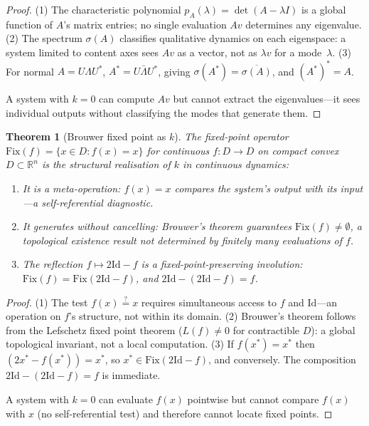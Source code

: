\documentclass[11pt,a4paper]{article}
\newtheorem{theorem}{Theorem}
\newcommand{\recu}[1]{{\color{kcolor}#1}}
\def\recu#1{#1}%
\begin{document}
\begin{proof}
(1) The characteristic polynomial $p_A(\lambda) = \det(A - \lambda I)$
is a global function of $A$'s matrix entries; no single evaluation $Av$
determines any eigenvalue. (2) The spectrum $\sigma(A)$ classifies
qualitative dynamics on each eigenspace: a system limited to content
axes sees $Av$ as a vector, not as $\lambda v$ for a mode~$\lambda$.
(3) For normal $A = U\Lambda U^*$, $A^* = U\bar\Lambda U^*$, giving
$\sigma(A^*) = \overline{\sigma(A)}$, and $(A^*)^* = A$.

A system with $k = 0$ can compute $Av$ but cannot extract the
eigenvalues---it sees individual outputs without classifying the modes
that generate them.
\end{proof}

\begin{theorem}[Brouwer fixed point as $\recu{k}$]
\label{thm:brouwer}
The fixed-point operator $\mathrm{Fix}(f) = \{x \in D : f(x) = x\}$
for continuous $f: D \to D$ on compact convex $D \subset \mathbb{R}^n$
is the structural realisation of $\recu{k}$ in continuous dynamics:
\begin{enumerate}[nosep]
  \item It is a meta-operation: $f(x) = x$ compares the system's output
    with its input---a self-referential diagnostic.
  \item It generates without cancelling: Brouwer's theorem guarantees
    $\mathrm{Fix}(f) \neq \emptyset$, a topological existence result
    not determined by finitely many evaluations of $f$.
  \item The reflection $f \mapsto 2\mathrm{Id} - f$ is a
    fixed-point-preserving involution: $\mathrm{Fix}(f) = \mathrm{Fix}
    (2\mathrm{Id} - f)$, and $2\mathrm{Id} - (2\mathrm{Id} - f) = f$.
\end{enumerate}
\end{theorem}

\begin{proof}
(1) The test $f(x) \stackrel{?}{=} x$ requires simultaneous access to
$f$ and $\mathrm{Id}$---an operation on $f$'s structure, not within
its domain. (2) Brouwer's theorem follows from the Lefschetz fixed
point theorem ($L(f) \neq 0$ for contractible $D$): a global
topological invariant, not a local computation.
(3) If $f(x^*) = x^*$ then $(2x^* - f(x^*)) = x^*$, so
$x^* \in \mathrm{Fix}(2\mathrm{Id} - f)$, and conversely.
The composition $2\mathrm{Id} - (2\mathrm{Id} - f) = f$ is immediate.

A system with $k = 0$ can evaluate $f(x)$ pointwise but cannot
compare $f(x)$ with $x$ (no self-referential test) and therefore
cannot locate fixed points.
\end{proof}
\end{document}
